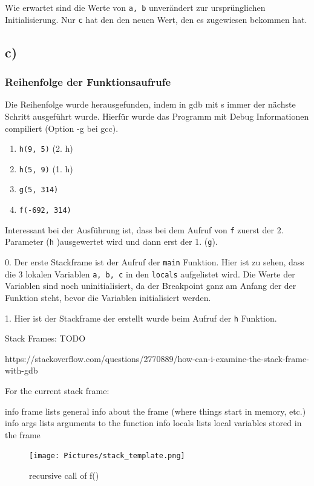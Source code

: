 \documentclass[12pt]{article}
\begin{document}
Wie erwartet sind die Werte von \texttt{a, b} unverändert zur ursprünglichen Initialisierung. Nur \texttt{c} hat den den neuen Wert, den es zugewiesen bekommen hat.

\subsection{c)}

\subsubsection{Reihenfolge der Funktionsaufrufe}

Die Reihenfolge wurde herausgefunden, indem in gdb mit s immer der nächste Schritt ausgeführt wurde. Hierfür wurde das Programm mit Debug Informationen compiliert (Option -g bei gcc).


\begin{enumerate}
\item \texttt{h(9, 5)} (2. h)
\item \texttt{h(5, 9)} (1. h)
\item \texttt{g(5, 314)}
\item \texttt{f(-692, 314)}
\end{enumerate}

Interessant bei der Ausführung ist, dass bei dem Aufruf von \texttt{f} zuerst der 2. Parameter (\texttt{h} )ausgewertet wird und dann erst der 1. (\texttt{g}).



0. Der erste Stackframe ist der Aufruf der \texttt{main} Funktion. Hier ist zu sehen, dass die 3 lokalen Variablen \texttt{a, b, c} in den \texttt{locals} aufgelistet wird. 
Die Werte der Variablen sind noch uninitialisiert, da der Breakpoint ganz am Anfang der der Funktion steht, bevor die Variablen initialisiert werden.

1. Hier ist der Stackframe der erstellt wurde beim Aufruf der  \texttt{h} Funktion. 


Stack Frames: TODO

https://stackoverflow.com/questions/2770889/how-can-i-examine-the-stack-frame-with-gdb


For the current stack frame:

    info frame lists general info about the frame (where things start in memory, etc.)
    info args lists arguments to the function
    info locals lists local variables stored in the frame

\begin{center}
\begin{figure}[h]
	\texttt{[image: Pictures/stack\_template.png]}
	\caption{recursive call of f()}
	\label{fig:recursive2}
\end{figure}
\end{center}
\end{document}
